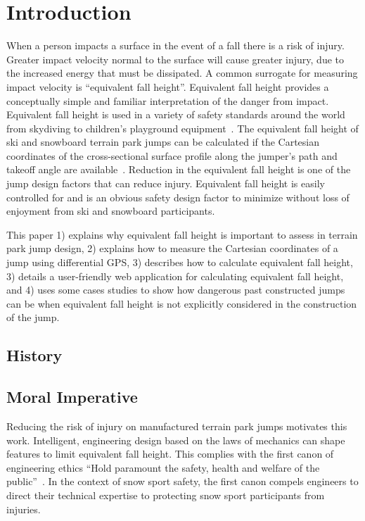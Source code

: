 \documentclass{article}
\begin{document}
\section{Introduction}
%
When a person impacts a surface in the event of a fall there is a risk of
injury. Greater impact velocity normal to the surface will cause greater
injury, due to the increased energy that must be dissipated. A common surrogate
for measuring impact velocity is ``equivalent fall height''.  Equivalent fall
height provides a conceptually simple and familiar interpretation of the danger
from impact. Equivalent fall height is used in a variety of safety standards
around the world from skydiving to children's playground
equipment~\cite{Chalmers1996}. The equivalent fall height of ski and snowboard
terrain park jumps can be calculated if the Cartesian coordinates of the
cross-sectional surface profile along the jumper's path and takeoff angle are
available~\cite{Hubbard2012}. Reduction in the equivalent fall height is one of
the jump design factors that can reduce injury. Equivalent fall height is
easily controlled for and is an obvious safety design factor to minimize
without loss of enjoyment from ski and snowboard participants.

This paper 1) explains why equivalent fall height is important to assess in
terrain park jump design, 2) explains how to measure the Cartesian coordinates
of a jump using differential GPS, 3) describes how to calculate equivalent fall
height, 3) details a user-friendly web application for calculating equivalent
fall height, and 4) uses some cases studies to show how dangerous past
constructed jumps can be when equivalent fall height is not explicitly
considered in the construction of the jump.

\subsection{History}
%

\subsection{Moral Imperative}
%
Reducing the risk of injury on manufactured terrain park jumps motivates this
work. Intelligent, engineering design based on the laws of mechanics can shape
features to limit equivalent fall height. This complies with the first canon of
engineering ethics ``Hold paramount the safety, health and welfare of the
public''~\cite{NSPE2019}. In the context of snow sport safety, the first canon
compels engineers to direct their technical expertise to protecting snow sport
participants from injuries.
\end{document}
